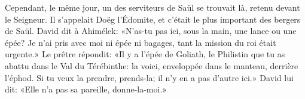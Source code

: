 Cependant, le même jour, un des serviteurs de Saül se trouvait là,
	retenu devant le Seigneur.
Il s’appelait Doëg l’Édomite, et c’était le plus important des bergers de Saül.
David dit à Ahimélek:
	«N’as-tu pas ici, sous la main, une lance ou une épée?
Je n’ai pris avec moi ni épée ni bagages, tant la mission du roi était urgente.»
Le prêtre répondit:
	«Il y a l’épée de Goliath, le Philistin que tu as abattu dans le Val du Térébinthe:
	la voici, enveloppée dans le manteau, derrière l’éphod.
Si tu veux la prendre, prends-la; il n’y en a pas d’autre ici.»
David lui dit: «Elle n’a pas sa pareille, donne-la-moi.»
